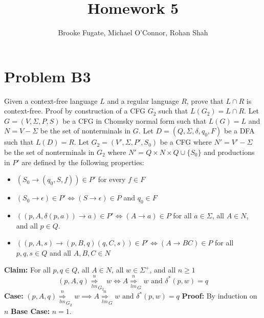 \documentclass[12pt]{article}
\begin{document}
\pagestyle{plain}
\titleformat{\subsection}[runin]
  {\normalfont\large\bfseries}{\thesubsection}{1em}{}

\title{Homework 5}
\author{Brooke Fugate, Michael O'Connor, Rohan Shah}
\date{}

\maketitle

\section*{Problem B3}
Given a context-free language $L$ and a regular language $R$, prove that
$L\cap R$ is context-free. Proof by construction of a CFG $G_2$ such that
$L(G_2) = L\cap R$. Let $G = (V,\Sigma,P,S)$ be a CFG in Chomsky normal form
such that $L(G) = L$ and $N = V - \Sigma$ be the set of nonterminals in $G$.
Let $D = (Q,\Sigma, \delta, q_0, F)$ be a DFA such that $L(D) = R$.
Let $G_2 = (V',\Sigma,P',S_0)$ be a CFG where $N' = V' - \Sigma$ be the set of
nonterminals in $G_2$ where $N' = Q\times N\times Q \cup \{S_0\}$ and
productions in $P'$ are defined by the following properties:
\begin{itemize}
\item $(S_0 \rightarrow (q_0,S,f)) \in P'$ for every $f \in F$
\item $(S_0 \rightarrow \epsilon) \in P' \iff (S\rightarrow \epsilon) \in P$ and
$q_0 \in F$
\item $((p,A,\delta(p,a)) \rightarrow a) \in P' \iff (A \rightarrow a) \in P$
for all $a \in \Sigma$, all $A \in N$, and all $p \in Q$.
\item $((p,A,s) \rightarrow (p,B,q)(q,C,s)) \in P' \iff (A \rightarrow BC)\in P$
for all $p,q,s \in Q$ and all $A,B,C \in N$
\end{itemize}
\textbf{Claim: } For all $p,q\in Q$, all $A\in N$, all $w\in \Sigma^+$,
and all $n\ge 1$
$$(p,A,q) \underset{lm}{\overset{n}{\Longrightarrow}}_{G_2} w
\iff A \underset{lm}{\overset{n}{\Longrightarrow}}_{G} w
\text{ and } \delta^*(p,w) = q$$
\textbf{Case: } $(p,A,q) \underset{lm}{\overset{n}{\Longrightarrow}}_{G_2} w
\implies A \underset{lm}{\overset{n}{\Longrightarrow}}_{G} w
\text{ and } \delta^*(p,w) = q$
\newline \textbf{Proof: } By induction on $n$
\newline \textbf{Base Case: } $n = 1$.
\end{document}
